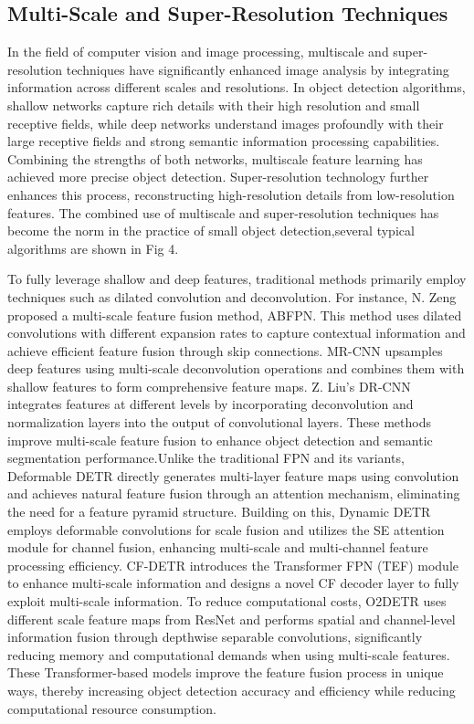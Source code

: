 \documentclass[journal]{IEEEtran}
\begin{document}
\label{section2}
\subsection{Multi-Scale and Super-Resolution Techniques}

In the field of computer vision and image processing, multiscale and super-resolution techniques have significantly enhanced image analysis by integrating information across different scales and resolutions. In object detection algorithms, shallow networks capture rich details with their high resolution and small receptive fields, while deep networks understand images profoundly with their large receptive fields and strong semantic information processing capabilities. Combining the strengths of both networks, multiscale feature learning has achieved more precise object detection. Super-resolution technology further enhances this process, reconstructing high-resolution details from low-resolution features. The combined use of multiscale and super-resolution techniques has become the norm in the practice of small object detection,several typical algorithms are shown in Fig 4.

To fully leverage shallow and deep features, traditional methods primarily employ techniques such as dilated convolution and deconvolution. For instance, N. Zeng proposed a multi-scale feature fusion method, ABFPN\cite{zeng2022small}. This method uses dilated convolutions with different expansion rates to capture contextual information and achieve efficient feature fusion through skip connections. MR-CNN\cite{liu2019mr} upsamples deep features using multi-scale deconvolution operations and combines them with shallow features to form comprehensive feature maps. Z. Liu's DR-CNN\cite{liu2020small} integrates features at different levels by incorporating deconvolution and normalization layers into the output of convolutional layers. These methods improve multi-scale feature fusion to enhance object detection and semantic segmentation performance.Unlike the traditional FPN\cite{lin2017feature} and its variants, Deformable DETR\cite{zhu2020deformable} directly generates multi-layer feature maps using convolution and achieves natural feature fusion through an attention mechanism, eliminating the need for a feature pyramid structure. Building on this, Dynamic DETR\cite{chen2020survey} employs deformable convolutions for scale fusion and utilizes the SE attention module\cite{hu2018squeeze} for channel fusion, enhancing multi-scale and multi-channel feature processing efficiency. CF-DETR\cite{cao2022cf} introduces the Transformer FPN (TEF) module to enhance multi-scale information and designs a novel CF decoder layer to fully exploit multi-scale information. To reduce computational costs, O2DETR\cite{ma2021oriented} uses different scale feature maps from ResNet\cite{he2016deep} and performs spatial and channel-level information fusion through depthwise separable convolutions, significantly reducing memory and computational demands when using multi-scale features. These Transformer-based models improve the feature fusion process in unique ways, thereby increasing object detection accuracy and efficiency while reducing computational resource consumption.
\end{document}
